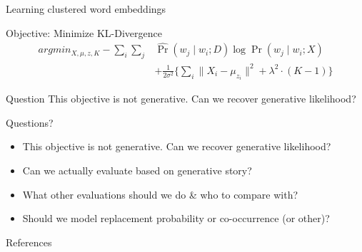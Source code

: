 \documentclass{beamer}
\begin{document}
\begin{frame}{Learning clustered word embeddings}
  \begin{block}{Objective: Minimize KL-Divergence}
    \begin{align*}
    argmin_{X, \mu, z, K}  - \sum_i \sum_j & \hat{\Pr}(w_j \mid w_i ; D) \log \Pr(w_j \mid w_i ; X) \\
    &+ \frac{1}{2 \sigma^2} \{ \sum_i \| X_i - \mu_{z_i} \|^2 + \lambda^2 \cdot (K - 1) \} 
    \end{align*}
  \end{block}
  \pause
  \begin{alertblock}{Question}
	This objective is not generative. Can we recover generative likelihood?
  \end{alertblock}
\end{frame}

\begin{frame}{Questions?}
  \begin{itemize}
    \item This objective is not generative. Can we recover generative likelihood?
    \item Can we actually evaluate based on generative story?
    \item What other evaluations should we do \& who to compare with?
    	\item Should we model replacement probability or co-occurrence (or other)?
  \end{itemize}
\end{frame}

\appendix

\begin{frame}[allowframebreaks]{References}
  
  
\end{frame}
\end{document}
